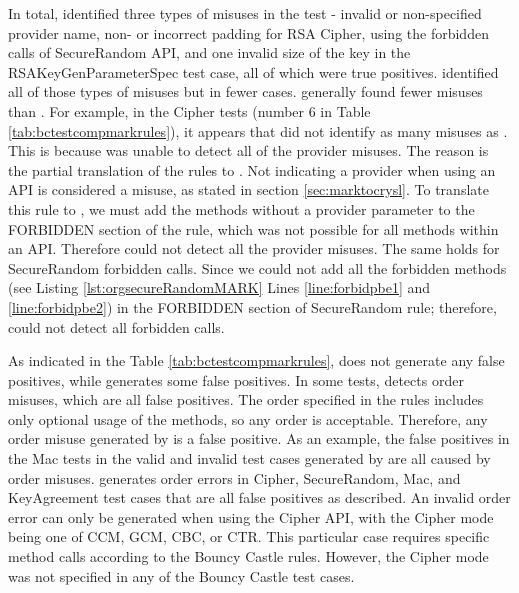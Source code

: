 In total, \codyze{} identified three types of misuses in the test - invalid or non-specified provider name, non- or incorrect padding for RSA Cipher, using the forbidden calls of SecureRandom API, and one invalid size of the key in the RSAKeyGenParameterSpec test case, all of which were true positives. \cognicryptsast{} identified all of those types of misuses but in fewer cases. \cognicryptsast{} generally found fewer misuses than \codyze. For example, in the Cipher tests (number 6 in Table \ref{tab:bctestcompmarkrules}), it appears that \cognicryptsast{} did not identify as many misuses as \codyze. This is because \cognicryptsast{} was unable to detect all of the provider misuses. The reason is the partial translation of the \MARK{} rules to \crysl. Not indicating a provider when using an API is considered a misuse, as stated in section \ref{sec:marktocrysl}. To translate this rule to \crysl, we must add the methods without a provider parameter to the FORBIDDEN section of the \crysl{} rule, which was not possible for all methods within an API. Therefore \cognicryptsast{} could not detect all the provider misuses. The same holds for SecureRandom forbidden calls. Since we could not add all the forbidden methods (see Listing \ref{lst:orgsecureRandomMARK} Lines \ref{line:forbidpbe1} and \ref{line:forbidpbe2}) in the FORBIDDEN section of SecureRandom \crysl{} rule; therefore, \cognicryptsast{} could not detect all forbidden calls.


As indicated in the Table \ref{tab:bctestcompmarkrules}, \codyze{} does not generate any false positives, while \cognicryptsast{} generates some false positives. In some tests, \cognicryptsast{} detects order misuses, which are all false positives. The order specified in the rules includes only optional usage of the methods, so any order is acceptable. Therefore, any order misuse generated by \cognicryptsast{} is a false positive. As an example, the false positives in the Mac tests in the valid and invalid test cases generated by \cognicryptsast{} are all caused by order misuses. \cognicryptsast generates order errors in Cipher, SecureRandom, Mac, and KeyAgreement test cases that are all false positives as described. An invalid order error can only be generated when using the Cipher API, with the Cipher mode being one of CCM, GCM, CBC, or CTR. This particular case requires specific method calls according to the \MARK{} Bouncy Castle rules. However, the Cipher mode was not specified in any of the Bouncy Castle test cases.


